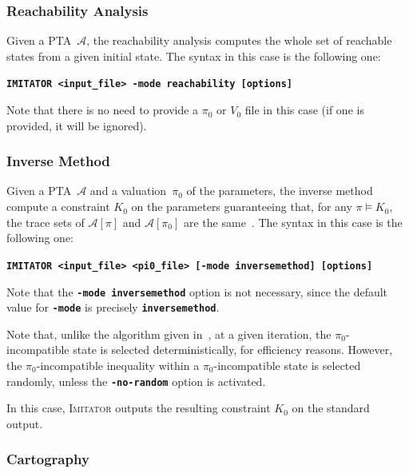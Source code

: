 \documentclass[a4paper,11pt]{article}
\newcommand{\A}{\mathcal{A}}
\newcommand{\imitator}{\textsc{Imitator}}
\newcommand{\imitatorExec}{\code{IMITATOR}}
\newcommand{\code}[1]{\textbf{\texttt{#1}}}
\begin{document}
\subsubsection{Reachability Analysis} \label{ss:mode_reachability}

Given a PTA~$\A$, the reachability analysis computes the whole set of reachable states from a given initial state.
The syntax in this case is the following one:

\code{\imitatorExec{} <input\_file> -mode reachability [options]}

Note that there is no need to provide a $\pi_0$ or $V_0$ file in this case (if one is provided, it will be ignored).



\subsubsection{Inverse Method} \label{ss:mode_inversemethod}

Given a PTA~$\A$ and a valuation~$\pi_0$ of the parameters, the inverse method compute a constraint $K_0$ on the parameters guaranteeing that, for any $\pi \models K_0$, the trace sets of $\A[\pi]$ and $\A[\pi_0]$ are the same~\cite{AS13}.
The syntax in this case is the following one:

\code{\imitatorExec{} <input\_file> <pi0\_file> [-mode inversemethod] [options]}

Note that the \code{-mode inversemethod} option is not necessary, since the default value for \code{-mode} is precisely \code{inversemethod}.

Note that, unlike the algorithm given in~\cite{AS13}, at a given iteration, the $\pi_0$-incompatible state is selected deterministically, for efficiency reasons.
However, the $\pi_0$-incompatible inequality within a $\pi_0$-incompatible state is selected randomly, unless the \code{-no-random} option is activated.

In this case, \imitator{} outputs the resulting constraint $K_0$ on the standard output.


\subsubsection{Cartography} \label{ss:mode_cartography}
\end{document}

